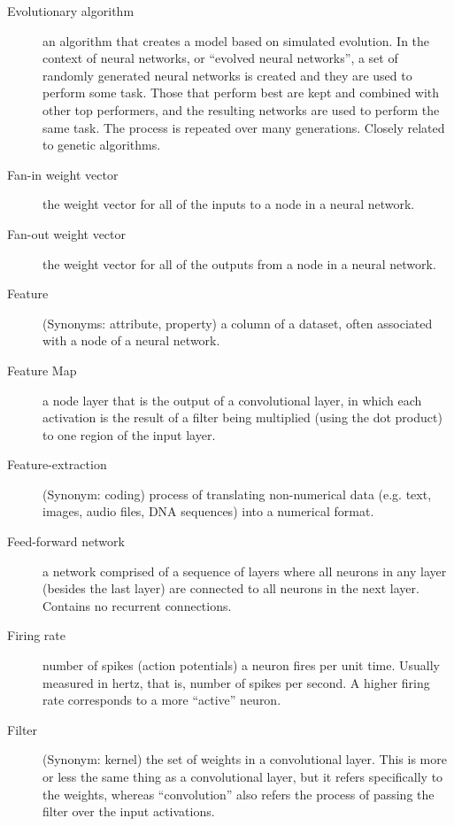 \begin{description}
\item[Evolutionary algorithm] an algorithm that creates a model based on simulated evolution. In the context of neural networks, or ``evolved neural networks'', a set of randomly generated neural networks is created and they are used to perform some task.  Those that perform best are kept and combined with other top performers, and the resulting networks are used to perform the same task. The process is repeated over many generations. Closely related to genetic algorithms.

\item[Fan-in weight vector] the weight vector for all of the inputs to a node in a neural network.

\item[Fan-out weight vector] the weight vector for all of the outputs from a node in a neural network.

\item[Feature] (Synonyms: attribute, property) a column of a dataset, often associated with a node of a neural network.

\item[Feature Map] a node layer that is the output of a convolutional layer, in which each activation is the result of a filter being multiplied (using the dot product) to one region of the input layer.

\item[Feature-extraction] (Synonym:  coding)  process of translating non-numerical data (e.g. text, images, audio files, DNA sequences) into a numerical format. %

\item[Feed-forward network] a network comprised of a sequence of layers where all neurons in any layer (besides the last layer) are connected to all neurons in the next layer. Contains no recurrent connections.

\item[Firing rate] number of spikes (action potentials) a neuron fires per unit time. Usually measured in hertz, that is, number of spikes per second. A higher firing rate corresponds to a more ``active'' neuron. 

\item[Filter] (Synonym: kernel) the set of weights in a convolutional layer. This is more or less the same thing as a convolutional layer, but it refers specifically to the weights, whereas ``convolution'' also refers the process of passing the filter over the input activations.


\end{description}
